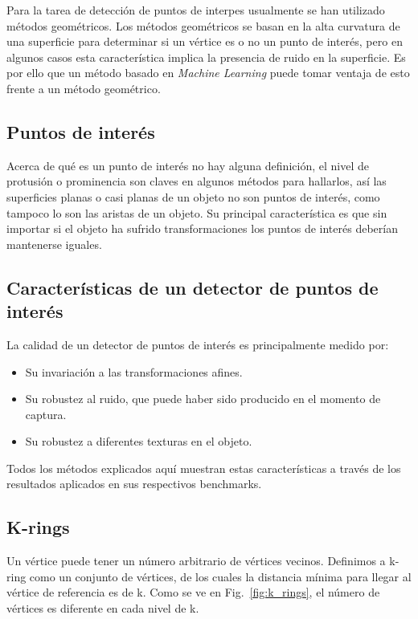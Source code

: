 \documentclass[conference]{IEEEtran}
\begin{document}
Para la tarea de detección de puntos de interpes usualmente se han utilizado métodos geométricos. Los métodos geométricos se basan en la alta curvatura de una superficie para determinar si un vértice es o no un punto de interés, pero en algunos casos esta característica implica la presencia de ruido en la superficie. Es por ello que un método basado en \textit{Machine Learning} puede tomar ventaja de esto frente a un método geométrico.

\subsection{Puntos de interés}
Acerca de qué es un punto de interés no hay alguna definición, el nivel de protusión o prominencia son claves en algunos métodos para hallarlos, así las superficies planas o casi planas de un objeto no son puntos de interés, como tampoco lo son las aristas de un objeto. Su principal característica es que sin importar si el objeto ha sufrido transformaciones los puntos de interés deberían mantenerse iguales.

\subsection{Características de un detector de puntos de interés}
La calidad de un detector de puntos de interés es principalmente medido por:

\begin{itemize}
	\item Su invariación a las transformaciones afines.
	\item Su robustez al ruido, que puede haber sido producido en el momento de captura.
	\item Su robustez a diferentes texturas en el objeto.
\end{itemize}

Todos los métodos explicados aquí muestran estas características a través de los resultados aplicados en sus respectivos benchmarks.

\subsection{K-rings}
Un vértice puede tener un número arbitrario de vértices vecinos. Definimos a k-ring como un conjunto de vértices, de los cuales la distancia mínima para llegar al vértice de referencia es de k. Como se ve en Fig.~\ref{fig:k_rings}, el número de vértices es diferente en cada nivel de k.
\end{document}
